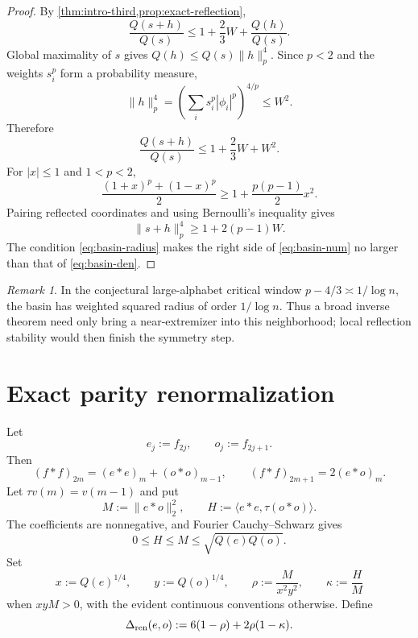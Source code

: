 \documentclass[11pt,reqno]{amsart}
\numberwithin{equation}{section}
\theoremstyle{definition}
\theoremstyle{remark}
\newtheorem{remark}[remark]{Remark}
\newcommand{\norm}[1]{\lVert #1\rVert}
\newcommand{\ip}[2]{\langle #1,#2\rangle}
\begin{document}
\begin{proof}
By \cref{thm:intro-third,prop:exact-reflection},
\[
  \frac{Q(s+h)}{Q(s)}
  \le1+\frac23W+\frac{Q(h)}{Q(s)}.
\]
Global maximality of $s$ gives
$Q(h)\le Q(s)\norm h_p^4$.  Since $p<2$ and the weights $s_i^p$ form a
probability measure,
\[
  \norm h_p^4
  =\left(\sum_i s_i^p|\phi_i|^p\right)^{4/p}\le W^2.
\]
Therefore
\begin{equation}\label{eq:basin-num}
  \frac{Q(s+h)}{Q(s)}\le1+\frac23W+W^2.
\end{equation}
For $|x|\le1$ and $1<p<2$,
\[
  \frac{(1+x)^p+(1-x)^p}{2}
  \ge1+\frac{p(p-1)}2x^2.
\]
Pairing reflected coordinates and using Bernoulli's inequality gives
\begin{equation}\label{eq:basin-den}
  \norm{s+h}_p^4\ge1+2(p-1)W.
\end{equation}
The condition \eqref{eq:basin-radius} makes the right side of
\eqref{eq:basin-num} no larger than that of \eqref{eq:basin-den}.
\end{proof}

\begin{remark}
In the conjectural large-alphabet critical window
$p-4/3\asymp1/\log n$, the basin has weighted squared radius of order
$1/\log n$.  Thus a broad inverse theorem need only bring a near-extremizer
into this neighborhood; local reflection stability would then finish the
symmetry step.
\end{remark}

\section{Exact parity renormalization}

Let
\begin{equation}\label{eq:evenodd-children}
  e_j:=f_{2j},
  \qquad
  o_j:=f_{2j+1}.
\end{equation}
Then
\begin{equation}\label{eq:evenodd-conv}
  (f*f)_{2m}=(e*e)_m+(o*o)_{m-1},
  \qquad
  (f*f)_{2m+1}=2(e*o)_m.
\end{equation}
Let $\tau v(m)=v(m-1)$ and put
\begin{equation}\label{eq:MH}
  M:=\norm{e*o}_2^2,
  \qquad
  H:=\ip{e*e}{\tau(o*o)}.
\end{equation}
The coefficients are nonnegative, and Fourier Cauchy--Schwarz gives
\begin{equation}\label{eq:MH-bounds}
  0\le H\le M\le\sqrt{Q(e)Q(o)}.
\end{equation}
Set
\begin{equation}\label{eq:xy-rhokappa}
  x:=Q(e)^{1/4},
  \qquad y:=Q(o)^{1/4},
  \qquad
  \rho:=\frac{M}{x^2y^2},
  \qquad
  \kappa:=\frac HM
\end{equation}
when $xyM>0$, with the evident continuous conventions otherwise.
Define
\begin{equation}\label{eq:Delta-ren}
  \Delta_{\rm ren}(e,o)
  :=6(1-\rho)+2\rho(1-\kappa).
\end{equation}
\end{document}
